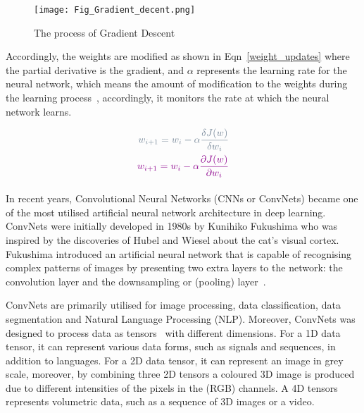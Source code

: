 \begin{figure} [h!]
	\begin{center}
		\centering
	\texttt{[image: Fig\_Gradient\_decent.png]}
	\end{center}
	
\caption{The process of Gradient Descent}
 
	\label{fig:GD}
\end{figure}
Accordingly, the weights are modified as shown in Eqn~\ref{weight_updates} where the partial derivative   is the gradient, and \(\alpha \) represents the learning rate for the neural network, which means the amount of modification to the weights during the learning process~\cite{Russell2010}, accordingly, it monitors the rate at which the neural network learns.


\begin{equation}\begin{aligned}
\DIFdelmath{
w_{i+1}= w_{i} -\alpha \frac{\delta J(w)}{\delta w_i} }\\
\DIFaddmath{
w_{i+1}= w_{i} -\alpha \frac{\partial J(w)}{\partial w_i} }
\end{aligned}
\label{weight_updates}\end{equation}


\paragraph{}
In recent years, Convolutional Neural Networks (CNNs or ConvNets)
became one of the most utilised artificial neural network architecture in deep learning.
ConvNets were initially developed in 1980s by Kunihiko Fukushima who was inspired by the discoveries of Hubel and Wiesel about the cat's visual cortex. 
Fukushima introduced an artificial neural network that is capable of recognising complex patterns of images by presenting two extra layers to the network: the convolution layer and the downsampling or (pooling) layer~\cite{Fukushima1980}.

ConvNets are primarily utilised for image processing, data classification, data segmentation and Natural Language Processing (NLP).
Moreover, ConvNets was designed to process data as tensors~\cite{Fukushima1980} with different dimensions. 
For a 1D data tensor, it can represent various data forms, such as signals and sequences, in addition to languages.
For a 2D data tensor, it can represent an image in grey scale,
moreover, by combining three 2D tensors a coloured 3D image is produced due to different intensities of the pixels in the (RGB) channels.
A 4D tensors represents volumetric data, such as a sequence of 3D images  or a video.

